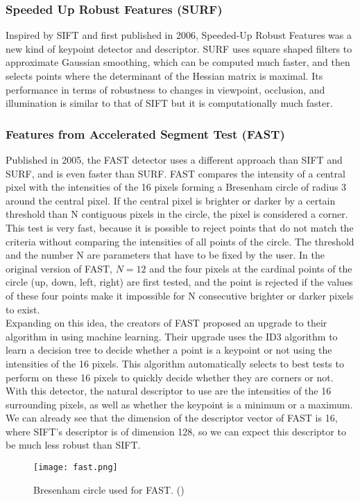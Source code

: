 \subsubsection{Speeded Up Robust Features (SURF)}
Inspired by SIFT and first published in 2006, Speeded-Up Robust Features \cite{surf} was a new kind of keypoint detector and descriptor. SURF uses square shaped filters to approximate Gaussian smoothing, which can be computed much faster, and then selects points where the determinant of the Hessian matrix is maximal. Its performance in terms of robustness to changes in viewpoint, occlusion, and illumination is similar to that of SIFT but it is computationally much faster.

\subsubsection{Features from Accelerated Segment Test (FAST)}
Published in 2005, the FAST detector \cite{fast} uses a different approach than SIFT and SURF, and is even faster than SURF. FAST compares the intensity of a central pixel with the intensities of the 16 pixels forming a Bresenham circle of radius 3 around the central pixel. If the central pixel is brighter or darker by a certain threshold than N contiguous pixels in the circle, the pixel is considered a corner. This test is very fast, because it is possible to reject points that do not match the criteria without comparing the intensities of all points of the circle. The threshold and the number N are parameters that have to be fixed by the user. In the original version of FAST, $N = 12$ and the four pixels at the cardinal points of the circle (up, down, left, right) are first tested, and the point is rejected if the values of these four points make it impossible for N consecutive brighter or darker pixels to exist.\\

Expanding on this idea, the creators of FAST proposed an upgrade to their algorithm in \cite{fast2} using machine learning. Their upgrade uses the ID3 algorithm to learn a decision tree to decide whether a point is a keypoint or not using the intensities of the 16 pixels. This algorithm automatically selects to best tests to perform on these 16 pixels to quickly decide whether they are corners or not.\\

With this detector, the natural descriptor to use are the intensities of the 16 surrounding pixels, as well as whether the keypoint is a minimum or a maximum. We can already see that the dimension of the descriptor vector of FAST is 16, where SIFT's descriptor is of dimension 128, so we can expect this descriptor to be much less robust than SIFT.
\begin{figure}[H]
\centering
\texttt{[image: fast.png]}
\caption{Bresenham circle used for FAST. (\cite{fast})}
\label{fig:fast}
\end{figure}

